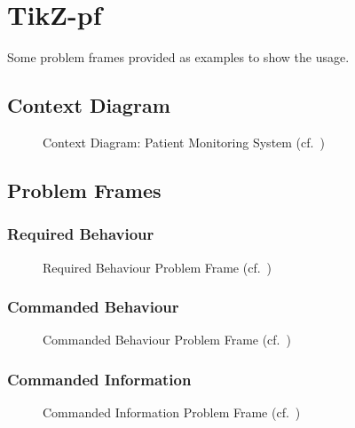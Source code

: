 \documentclass{article}
\begin{document}
\section{TikZ-pf}

Some problem frames provided as examples to show the usage.

\subsection{Context Diagram}

\begin{figure}[htbp]
\centering

\caption{{Context Diagram}: Patient Monitoring System (cf.~\cite{Jackson:2001}) \label{fig:cd}}
\end{figure}


\subsection{Problem Frames}

\subsubsection{Required Behaviour}
\begin{figure}[htbp]
\centering

\caption{{Required Behaviour} {Problem Frame} (cf.~\cite{Jackson:2001}) \label{fig:rb}}
\end{figure}


\subsubsection{Commanded Behaviour}
\begin{figure}[htbp]
\centering

\caption{{Commanded Behaviour} {Problem Frame} (cf.~\cite{Jackson:2001}) \label{fig:cb}}
\end{figure}


\subsubsection{Commanded Information}
\begin{figure}[htbp]
\centering

\caption{{Commanded Information} {Problem Frame} (cf.~\cite{Jackson:2001}) \label{fig:ci}}
\end{figure}

\end{document}
